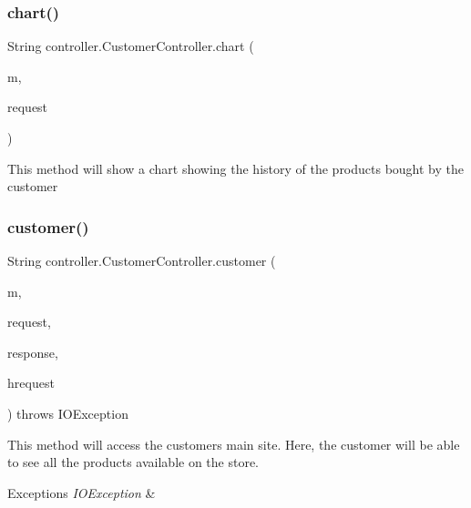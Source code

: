 \subsubsection{\texorpdfstring{chart()}{chart()}}
{\footnotesize\ttfamily String controller.\+Customer\+Controller.\+chart (\begin{DoxyParamCaption}\item[{Model}]{m,  }\item[{Web\+Request}]{request }\end{DoxyParamCaption})\hspace{0.3cm}{\ttfamily [inline]}}

This method will show a chart showing the history of the products bought by the customer \mbox{\label{classcontroller_1_1_customer_controller_a5496f4bf5f03f585ee223c0192d4fc85}} 
\subsubsection{\texorpdfstring{customer()}{customer()}}
{\footnotesize\ttfamily String controller.\+Customer\+Controller.\+customer (\begin{DoxyParamCaption}\item[{Model}]{m,  }\item[{Web\+Request}]{request,  }\item[{Http\+Servlet\+Response}]{response,  }\item[{Http\+Servlet\+Request}]{hrequest }\end{DoxyParamCaption}) throws I\+O\+Exception\hspace{0.3cm}{\ttfamily [inline]}}

This method will access the customer\textquotesingle{}s main site. Here, the customer will be able to see all the products available on the store. 
\begin{DoxyExceptions}{Exceptions}
{\em I\+O\+Exception} & \\
\hline
\end{DoxyExceptions}
\mbox{\label{classcontroller_1_1_customer_controller_a74ff447f25dce313f84a08cf5356f8e8}} 
